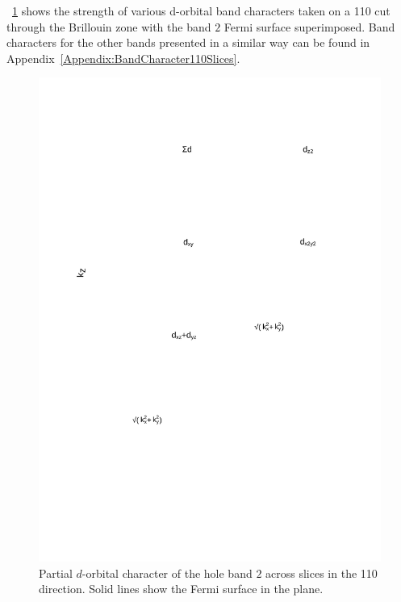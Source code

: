 \Fig~\ref{Fig:3:Band2DCharacter} shows the strength of various d-orbital band characters taken on a 110 cut through the \BaFeP Brillouin zone with the band $2$ Fermi surface superimposed. Band characters for the other bands presented in a similar way can be found in Appendix~\ref{Appendix:BandCharacter110Slices}.
\begin{figure}[htbp]
    \begin{center}
        \includegraphics[scale=0.7]{Chapter3-dHvABaFe2P2/Figures/AngleDepMeasurements/BandCharacterPlot/Band2_110Slice_BandCharacter}
        \caption{Partial $d$-orbital character of the hole band $2$ across slices in the 110 direction. Solid lines show the Fermi surface in the plane.}
        \label{Fig:3:Band2DCharacter}
    \end{center}
\end{figure}
